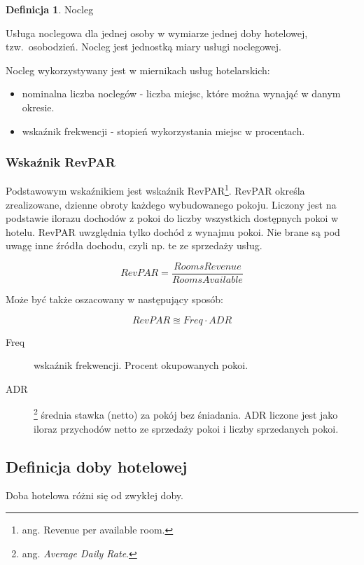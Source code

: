 \documentclass[a4paper,onecolumn,oneside,11pt,wide,floatssmall]{mwrep}
\theoremstyle{definition}
\newtheorem{defn}{Definicja}[section]
\theoremstyle{plain}%
\theoremstyle{remark}
\begin{document}
\begin{defn}{Nocleg}

Usługa noclegowa dla jednej osoby w wymiarze jednej doby hotelowej, \mbox{tzw. 
osobodzień.} Nocleg jest jednostką miary usługi noclegowej.

\end{defn} 

Nocleg wykorzystywany jest w miernikach usług hotelarskich:
\begin{itemize}
  \item nominalna liczba noclegów - liczba miejsc, które można wynająć w 
  danym okresie.
  \item wskaźnik frekwencji - stopień wykorzystania miejsc w procentach.
\end{itemize}

\subsubsection{Wskaźnik RevPAR}
Podstawowym wskaźnikiem jest wskaźnik RevPAR\footnote{ang. Revenue per 
available room.}. RevPAR określa zrealizowane, 
dzienne obroty każdego wybudowanego pokoju. Liczony jest na podstawie
 ilorazu dochodów z pokoi do liczby wszystkich dostępnych pokoi w hotelu. RevPAR uwzględnia tylko 
 dochód z wynajmu pokoi. Nie brane są pod uwagę inne źródła dochodu, czyli np. te ze sprzedaży usług.

\begin{equation}
RevPAR = \frac{Rooms Revenue}{Rooms Available}
\end{equation}

Może być także oszacowany w następujący sposób:

\begin{equation}
RevPAR \approxeq Freq \cdot ADR
\end{equation}

\begin{description}
  \item[Freq] wskaźnik frekwencji. Procent okupowanych pokoi.
  \item[ADR]\footnote{ang. {\em Average Daily Rate}. } średnia stawka (netto) 
  za pokój bez śniadania. ADR liczone jest jako iloraz przychodów netto ze 
  sprzedaży pokoi i liczby sprzedanych pokoi.

\end{description}

\subsection{Definicja doby hotelowej}
Doba hotelowa różni się od zwykłej doby.
\end{document}
